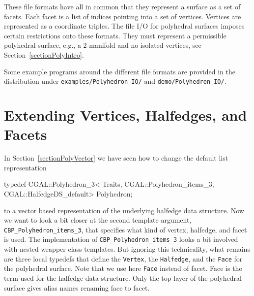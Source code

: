 \ccHtmlNoLinks
{}

\ccHtmlNoLinks
{}

\ccHtmlNoLinks
{}

\ccHtmlNoLinks
{}


These file formats have all in common that they represent a surface as
a set of facets. Each facet is a list of indices pointing into a set
of vertices. Vertices are represented as a coordinate triples. The
file I/O for polyhedral surfaces
 imposes certain restrictions onto these
formats. They must represent a permissible polyhedral surface, e.g., a
2-manifold and no isolated vertices, see Section~\ref{sectionPolyIntro}.

Some example programs around the different file formats are provided
in the distribution under \texttt{examples/Polyhedron\_IO/} and
\texttt{demo/Polyhedron\_IO/}.


\section{Extending Vertices, Halfedges, and Facets}
\label{sectionPolyExtend}

In Section~\ref{sectionPolyVector} we have seen how to change the 
default list representation

\begin{ccExampleCode}
typedef CGAL::Polyhedron_3< Traits, 
                            CGAL::Polyhedron_items_3, 
                            CGAL::HalfedgeDS_default>      Polyhedron;
\end{ccExampleCode}

to a vector based representation of the underlying halfedge data
structure. Now we want to look a bit closer at the second template argument,
\texttt{CBP\_Polyhedron\_items\_3}, that specifies what kind of vertex, 
halfedge, and facet is used. The implementation of 
\texttt{CBP\_Polyhedron\_items\_3} looks a bit involved with nested 
wrapper class templates. But ignoring this technicality, what remains
are three local typedefs that define the \texttt{Vertex}, the
\texttt{Halfedge}, and the \texttt{Face} for the polyhedral surface.
Note that we use here \texttt{Face} instead of facet. Face is the term
used for the halfedge data structure. Only the top layer of the
polyhedral surface gives alias names renaming face to facet.

